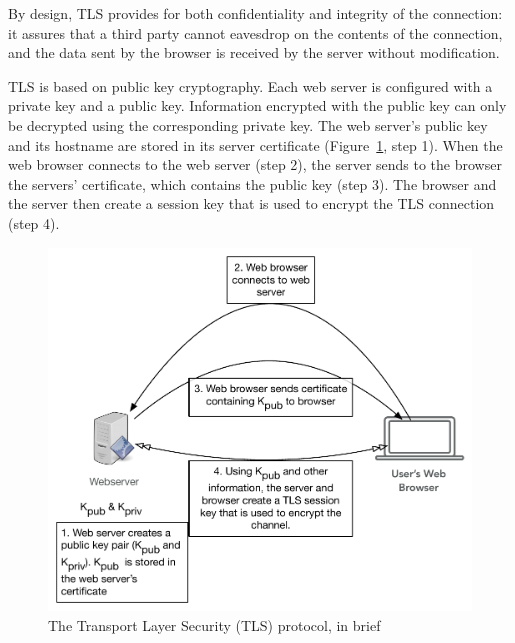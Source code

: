 \documentclass[fleqn,12pt]{wlscirep}
\begin{document}
By design, TLS
provides for both confidentiality and integrity of the connection: it
assures that a third party cannot eavesdrop on the contents of the
connection, and the data sent by the browser is received by the server
without modification.

TLS is based on public key cryptography. Each web server is configured
with a private key and a public key. Information encrypted with the
public key can only be decrypted using the corresponding private
key. The web server's public key and its hostname are stored in its
server certificate (Figure~\ref{tls}, step 1). When the web browser
connects to the web server (step 2), the server sends to the browser
the servers' certificate, which contains the public key (step 3). The
browser and the server then create a session key that is used to
encrypt the TLS connection (step 4).

\begin{figure}
  \includegraphics[width=\textwidth]{art/tls.pdf}
  \caption{The Transport Layer Security (TLS) protocol, in brief}\label{tls}
  \end{figure}
\end{document}
